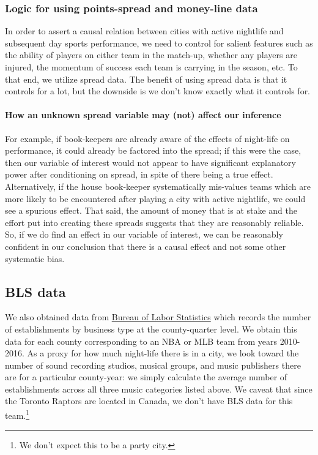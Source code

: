 \documentclass[letterpaper,12pt]{article}
\begin{document}
\subsubsection{Logic for using points-spread and money-line data}
In order to assert a causal relation between cities with active nightlife 
and subsequent day sports performance, we need to control for salient
features such as the ability of players on either team in the match-up,
whether any players are injured, the momentum of success each team is carrying
in the season, etc. To that end, we utilize spread data.\citep{anderson} The benefit of
using spread data is that it controls for a lot, but the downside is
we don't know exactly what it controls for.

\paragraph{How an unknown spread variable may (not) affect our inference}
For example, if book-keepers
are already aware of the effects of night-life on performance, it could
already be factored into the spread; if this were the case, then our variable
of interest would not appear to have significant explanatory power
after conditioning on spread, in spite of there being
a true effect. Alternatively,
if the house book-keeper systematically mis-values
teams which are more likely to be encountered after playing a city with active nightlife,
we could see a spurious effect. 
That said, the amount of money that is at stake and the effort put into creating these spreads 
suggests that they are reasonably reliable. 
So, if we do find an effect in our variable of interest,
we can be reasonably confident in our conclusion that there is a causal effect and not some other systematic bias.


\subsection{BLS data} We also obtained data from
\href{https://www.bls.gov/data/}{Bureau of Labor Statistics} which records the number of establishments by business type at the county-quarter level. We obtain this data for each county corresponding
to an NBA or MLB team from years 2010-2016. 
As a proxy for how much night-life there is in a city, we look toward the 
number of sound recording studios, musical groups, and music publishers there 
are for a particular county-year: we simply calculate the average number of establishments across all three music categories listed above. We caveat that since the Toronto Raptors are located in Canada, we don't have BLS data for this team.\footnote{We don't expect this to be a party city.}
\end{document}
